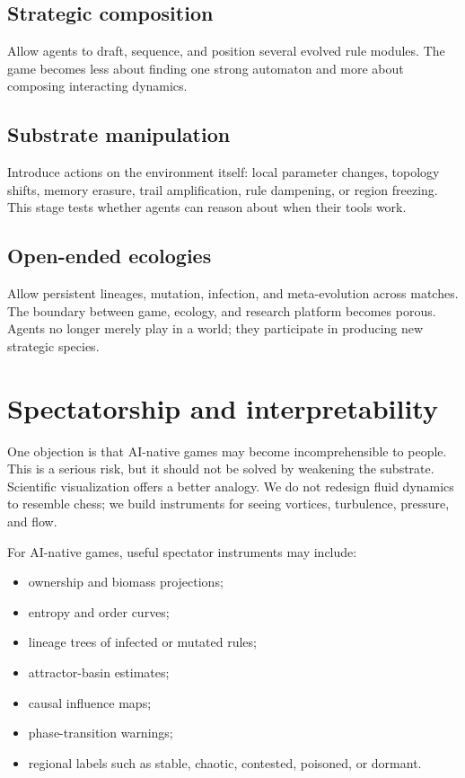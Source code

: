 \documentclass[11pt,a4paper]{article}
\theoremstyle{plain}
\theoremstyle{definition}
\begin{document}
\subsection{Strategic composition}

Allow agents to draft, sequence, and position several evolved rule modules. The game becomes less about finding one strong automaton and more about composing interacting dynamics.

\subsection{Substrate manipulation}

Introduce actions on the environment itself: local parameter changes, topology shifts, memory erasure, trail amplification, rule dampening, or region freezing. This stage tests whether agents can reason about when their tools work.

\subsection{Open-ended ecologies}

Allow persistent lineages, mutation, infection, and meta-evolution across matches. The boundary between game, ecology, and research platform becomes porous. Agents no longer merely play in a world; they participate in producing new strategic species.

\section{Spectatorship and interpretability}\label{sec:spectatorship}

One objection is that AI-native games may become incomprehensible to people. This is a serious risk, but it should not be solved by weakening the substrate. Scientific visualization offers a better analogy. We do not redesign fluid dynamics to resemble chess; we build instruments for seeing vortices, turbulence, pressure, and flow.

For AI-native games, useful spectator instruments may include:
\begin{itemize}
  \item ownership and biomass projections;
  \item entropy and order curves;
  \item lineage trees of infected or mutated rules;
  \item attractor-basin estimates;
  \item causal influence maps;
  \item phase-transition warnings;
  \item regional labels such as stable, chaotic, contested, poisoned, or dormant.
\end{itemize}
\end{document}
